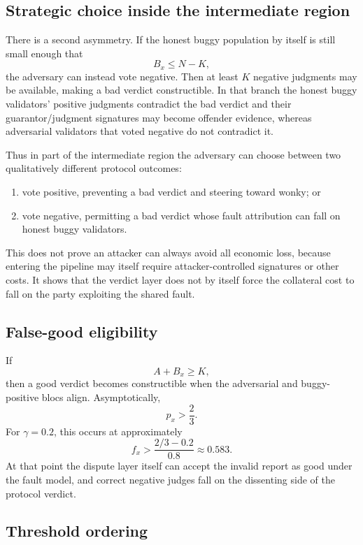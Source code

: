 \subsection{Strategic choice inside the intermediate region}

There is a second asymmetry. If the honest buggy population by itself is still small enough that
\[
B_x\le N-K,
\]
the adversary can instead vote negative. Then at least \(K\) negative judgments may be available, making a bad verdict constructible. In that branch the honest buggy validators' positive judgments contradict the bad verdict and their guarantor/judgment signatures may become offender evidence, whereas adversarial validators that voted negative do not contradict it.

Thus in part of the intermediate region the adversary can choose between two qualitatively different protocol outcomes:
\begin{enumerate}[label=(\alph*)]
\item vote positive, preventing a bad verdict and steering toward wonky; or
\item vote negative, permitting a bad verdict whose fault attribution can fall on honest buggy validators.
\end{enumerate}

This does not prove an attacker can always avoid all economic loss, because entering the pipeline may itself require attacker-controlled signatures or other costs. It shows that the verdict layer does not by itself force the collateral cost to fall on the party exploiting the shared fault.

\subsection{False-good eligibility}

If
\[
A+B_x\ge K,
\]
then a good verdict becomes constructible when the adversarial and buggy-positive blocs align. Asymptotically,
\[
\boxed{p_x>\frac23.}
\]
For \(\gamma=0.2\), this occurs at approximately
\[
f_x>\frac{2/3-0.2}{0.8}\approx0.583.
\]
At that point the dispute layer itself can accept the invalid report as good under the fault model, and correct negative judges fall on the dissenting side of the protocol verdict.

\subsection{Threshold ordering}

